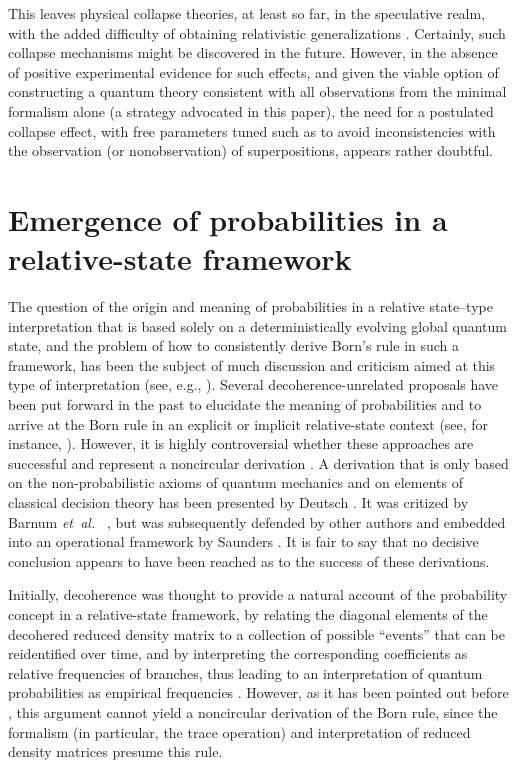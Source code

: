 \documentclass[12pt,aps,floatfix,amsmath,amssymb,showpacs,nofootinbib]{revtex4-2}
\newcommand{\etal}{\emph{et~al.\ }}
\begin{document}
This leaves physical collapse theories, at least so far, in the
speculative realm, with the added difficulty of obtaining relativistic
generalizations \cite{Bassi:2003:yb}.  Certainly, such collapse
mechanisms might be discovered in the future. However, in the absence
of positive experimental evidence for such effects, and given the
viable option of constructing a quantum theory consistent with all
observations from the minimal formalism alone (a strategy advocated in
this paper), the need for a postulated collapse effect, with free
parameters tuned such as to avoid inconsistencies with the observation
(or nonobservation) of superpositions, appears rather doubtful.


\section{Emergence of probabilities in a relative-state framework} \label{sec:prob}

The question of the origin and meaning of probabilities in a relative
state--type interpretation that is based solely on a deterministically
evolving global quantum state, and the problem of how to consistently
derive Born's rule in such a framework, has been the subject of much
discussion and criticism aimed at this type of interpretation (see,
e.g., \cite{Kent:1990:nm}). Several decoherence-unrelated
proposals have been put forward in the past to elucidate the meaning
of probabilities and to arrive at the Born rule in an explicit or
implicit relative-state context (see, for
instance, \cite{Everett:1957:rw,Hartle:1968:gg,DeWitt:1971:pz,%
  Graham:1973:ww,Geroch:1984:yt,Deutsch:1999:tz}). However, it is
highly controversial whether these approaches are successful and
represent a noncircular derivation
\cite{Stein:1984:uu,Kent:1990:nm,Squires:1990:lz}. A derivation that
is only based on the non-probabilistic axioms of quantum mechanics and
on elements of classical decision theory has been presented by Deutsch
\cite{Deutsch:1999:tz}. It was critized by Barnum \etal
\cite{Barnum:2000:oz}, but was subsequently defended by other authors
\cite{Gill:2003:tz,Wallace:2003:zr} and embedded into an operational
framework by Saunders \cite{Saunders:2002:tz}. It is fair to say that
no decisive conclusion appears to have been reached as to the success
of these derivations.

Initially, decoherence was thought to provide a natural account of the
probability concept in a relative-state framework, by relating the
diagonal elements of the decohered reduced density matrix to a
collection of possible ``events'' that can be reidentified over time,
and by interpreting the corresponding coefficients as relative
frequencies of branches, thus leading to an interpretation of quantum
probabilities as empirical frequencies
\cite{Zurek:1998:re,Deutsch:1999:tz}. However, as it has been pointed
out before \cite{Zeh:1996:gy,Zurek:2002:ii,Schlosshauer:2003:tv}, this
argument cannot yield a noncircular derivation of the Born rule, since
the formalism (in particular, the trace operation) and interpretation
of reduced density matrices presume this rule.
\end{document}
